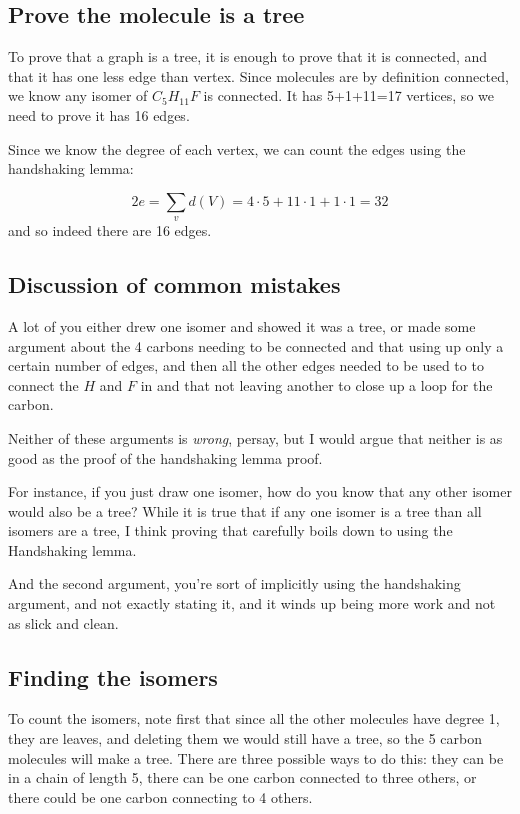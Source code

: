 \documentclass{amsart}
\begin{document}
\subsection*{Prove the molecule is a tree}

To prove that a graph is a tree, it is enough to prove that it is connected, and that it has one less edge than vertex.  Since molecules are by definition connected, we know any isomer of $C_5H_{11}F$ is connected.  It has 5+1+11=17 vertices, so we need to prove it has 16 edges.

Since we know the degree of each vertex, we can count the edges using the handshaking lemma:

$$2e=\sum_{v}d(V)=4\cdot 5+11\cdot 1+1\cdot 1=32$$
and so indeed there are 16 edges.

\subsection{Discussion of common mistakes}
A lot of you either drew one isomer and showed it was a tree, or made some argument about the 4 carbons needing to be connected and that using up only a certain number of edges, and then all the other edges needed to be used to to connect the $H$ and $F$ in and that not leaving another to close up a loop for the carbon.

Neither of these arguments is \emph{wrong}, persay, but I would argue that neither is as good as the proof of the handshaking lemma proof.

For instance, if you just draw one isomer, how do you know that any other isomer would also be a tree?  While it is true that if any one isomer is a tree than all isomers are a tree, I think proving that carefully boils down to using the Handshaking lemma.

And the second argument, you're sort of implicitly using the handshaking argument, and not exactly stating it, and it winds up being more work and not as slick and clean.

\subsection*{Finding the isomers}


To count the isomers, note first that since all the other molecules have degree 1, they are leaves, and deleting them we would still have a tree, so the 5 carbon molecules will make a tree.  There are three possible ways to do this: they can be in a chain of length 5, there can be one carbon connected to three others, or there could be one carbon connecting to 4 others.  
\end{document}
